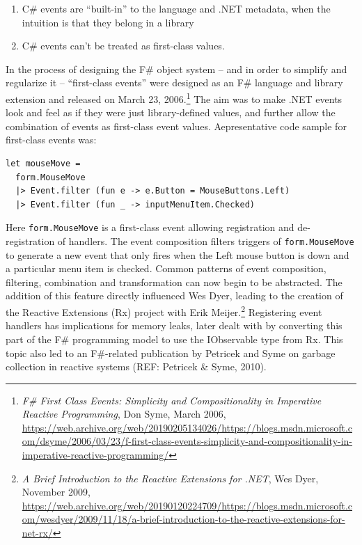 \documentclass[acmsmall]{acmart}\settopmatter{}
\begin{document}
\begin{enumerate}
\item C\# events are “built-in” to the language and .NET metadata, when the intuition is that they belong in a library
\item C\# events can’t be treated as first-class values.  
\end{enumerate}

In the process of designing the F\# object system – and in order to simplify and regularize it – “first-class events” were designed as an F\# language and library extension and released on March 23, 2006.\footnote{\textit{F\# First Class Events: Simplicity and Compositionality in Imperative Reactive Programming}, Don Syme, March 2006,  \url{https://web.archive.org/web/20190205134026/https://blogs.msdn.microsoft.com/dsyme/2006/03/23/f-first-class-events-simplicity-and-compositionality-in-imperative-reactive-programming/}}  The aim was to make .NET events look and feel as if they were just library-defined values, and further allow the combination of events as first-class event values. Aepresentative code sample for first-class events was:

\begin{verbatim}
let mouseMove = 
  form.MouseMove 
  |> Event.filter (fun e -> e.Button = MouseButtons.Left)
  |> Event.filter (fun _ -> inputMenuItem.Checked)
\end{verbatim}

Here \texttt{form.MouseMove} is a first-class event allowing registration and de-registration of handlers.  The event composition filters triggers of \texttt{form.MouseMove} to generate a new event that only fires when the Left mouse button is down and a particular menu item is checked.  Common patterns of event composition, filtering, combination and transformation can now begin to be abstracted.  The addition of this feature directly influenced Wes Dyer, leading to the creation of the Reactive Extensions (Rx) project with Erik Meijer.\footnote{\textit{A Brief Introduction to the Reactive Extensions for .NET}, Wes Dyer, November 2009, \url{https://web.archive.org/web/20190120224709/https://blogs.msdn.microsoft.com/wesdyer/2009/11/18/a-brief-introduction-to-the-reactive-extensions-for-net-rx/}}  Registering event handlers has implications for memory leaks, later dealt with by converting this part of the F\# programming model to use the IObservable type from Rx.  This topic also led to an F\#-related publication by Petricek and Syme on garbage collection in reactive systems (REF: Petricek \& Syme, 2010).
\end{document}
